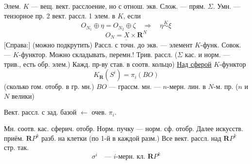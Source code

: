 Элем. $K$ --- вещ. вект. расслоение, но с отнош. экв.
Слож. --- прям. $\Sigma$. Умн. --- тензорное пр. 2 вект. рассл.
1 элем. в $K$, если
\begin{equation*}
O_{N_1}\oplus\eta=O_{N_2}\oplus\zeta\quad\Longrightarrow\quad\eta\overset K\sim\xi
\end{equation*}
\begin{equation*}
\underline{O_N=X\times\mathbf R^N}
\end{equation*}
[Справа:] (можно подкрутить)
Рассл. с точн. до экв. --- элемент $K$-функ.
Совок. --- $K$-функтор. Можно складывать, перемн.!
Трив. рассл. ($\Sigma$ кас. и норм. --- трив., есть обр. элем.)
Кажд. пр-ву став. в соотв. кольцо)
\underline{Над сферой} $K$-функтор
\begin{equation*}
K_{\mathbf R}(S^i)=\pi_i(BO)
\end{equation*}
(сколько гом. отобр. в гр. мн.)
$BO$ --- грассм. мн. --- $n$-мерн. лин. в $N$-м. пр.
($n$ и $N$ велики) 
\par\noindent\begin{minipage}{\linewidth}
Вект. рассл. с зад. базой $\longleftarrow$ очев. $\pi_i$.
\end{minipage}\par
Мн. соотв. кас. сферич. отобр.
Норм. пучку --- норм. сф. отобр. Далее искусств. приём.
$\mathbf RP^k$ разб. на клетки (по 1-й в каждой разм.)
Все вект. рассл. над $\mathbf RP^k$ стр. так.
\begin{equation*}
\sigma^i\quad\text{--- $i$-мерн. кл. }\mathbf RP^k
\end{equation*}
